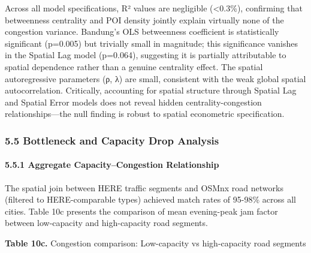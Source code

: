 \documentclass[
  12pt,
]{article}
\begin{document}
Across all model specifications, R² values are negligible (\textless0.3\%), confirming that betweenness centrality and POI density jointly explain virtually none of the congestion variance. Bandung's OLS betweenness coefficient is statistically significant (p=0.005) but trivially small in magnitude; this significance vanishes in the Spatial Lag model (p=0.064), suggesting it is partially attributable to spatial dependence rather than a genuine centrality effect. The spatial autoregressive parameters (ρ, λ) are small, consistent with the weak global spatial autocorrelation. Critically, accounting for spatial structure through Spatial Lag and Spatial Error models does not reveal hidden centrality-congestion relationships---the null finding is robust to spatial econometric specification.

\subsubsection{5.5 Bottleneck and Capacity Drop Analysis}\label{bottleneck-and-capacity-drop-analysis-1}

\paragraph{5.5.1 Aggregate Capacity--Congestion Relationship}\label{aggregate-capacitycongestion-relationship}

The spatial join between HERE traffic segments and OSMnx road networks (filtered to HERE-comparable types) achieved match rates of 95-98\% across all cities. Table 10c presents the comparison of mean evening-peak jam factor between low-capacity and high-capacity road segments.

\textbf{Table 10c.} Congestion comparison: Low-capacity vs high-capacity road segments
\end{document}
